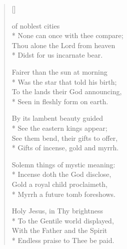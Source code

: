 \newHymn
{}

\begin{verse}[\versewidth]

 of noblest cities\\*
None can once with thee compare;\\
Thou alone the Lord from heaven\\*
Didst for us incarnate bear.


Fairer than the sun at morning\\*
Was the star that told his birth;\\
To the lands their God announcing,\\*
Seen in fleshly form on earth.

By its lambent beauty guided\\*
See the eastern kings appear;\\
See them bend, their gifts to offer,\\*
Gifts of incense, gold and myrrh.

Solemn things of mystic meaning:\\*
Incense doth the God disclose,\\
Gold a royal child proclaimeth,\\*
Myrrh a future tomb foreshows.

Holy Jesus, in Thy brightness\\*
To the Gentile world displayed,\\
With the Father and the Spirit\\*
Endless praise to Thee be paid.

\end{verse}


